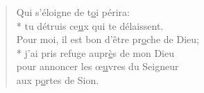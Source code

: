 \begin{verse}
Qui s’éloigne de t\underline{o}i périra: \\*
tu détruis ce\underline{u}x qui te délaissent. \\
Pour moi, il est bon d’être pr\underline{o}che de Dieu; \\*
j’ai pris refuge aupr\underline{è}s de mon Dieu \\
pour annoncer les œ\underline{u}vres du Seigneur \\
aux p\underline{o}rtes de Sion. \\
\end{verse}

